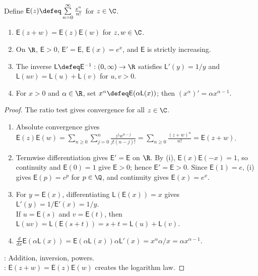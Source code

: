 \begin{theorem} \label{thm:exponential-logarithm-from-power-series} \\
Define $\mathsf{E}(z)\defeq\sum\limits_{n=0}^{\infty}\frac{z^n}{n!}$ for $z\in\C$.
\begin{enumerate}[label=(\roman*)]
\setlength{\itemsep}{0pt}
\item $\mathsf{E}(z+w)=\mathsf{E}(z)\mathsf{E}(w)$ for $z,w\in\C$.
\item On $\R$, $\mathsf{E}>0$, $\mathsf{E}'=\mathsf{E}$, $\mathsf{E}(x)=e^x$, and $\mathsf{E}$ is strictly increasing.
\item The inverse $\mathsf{L}\defeq\mathsf{E}^{-1}:(0,\infty)\to\R$ satisfies $\mathsf{L}'(y)=1/y$ and $\mathsf{L}(uv)=\mathsf{L}(u)+\mathsf{L}(v)$ for $u,v>0$.
\item For $x>0$ and $\alpha\in\R$, set $x^\alpha\defeq\mathsf{E}(\alpha\mathsf{L}(x))$; then $(x^\alpha)'=\alpha x^{\alpha-1}$.
\end{enumerate}
\begin{proof}
The ratio test gives convergence for all $z\in\C$.
\begin{enumerate}[label=(\roman*)]
\setlength{\itemsep}{0pt}
\item Absolute convergence gives $\mathsf{E}(z)\mathsf{E}(w)=\sum\limits_{n\geq0}\sum\limits_{j=0}^{n}\frac{z^jw^{n-j}}{j!(n-j)!}=\sum\limits_{n\geq0}\frac{(z+w)^n}{n!}=\mathsf{E}(z+w)$.
\item Termwise differentiation gives $\mathsf{E}'=\mathsf{E}$ on $\R$. By (i), $\mathsf{E}(x)\mathsf{E}(-x)=1$, so continuity and $\mathsf{E}(0)=1$ give $\mathsf{E}>0$; hence $\mathsf{E}'=\mathsf{E}>0$. Since $\mathsf{E}(1)=e$, (i) gives $\mathsf{E}(p)=e^p$ for $p\in\Q$, and continuity gives $\mathsf{E}(x)=e^x$.
\item For $y=\mathsf{E}(x)$, differentiating $\mathsf{L}(\mathsf{E}(x))=x$ gives $\mathsf{L}'(y)=1/\mathsf{E}'(x)=1/y$.\\
If $u=\mathsf{E}(s)$ and $v=\mathsf{E}(t)$, then $\mathsf{L}(uv)=\mathsf{L}(\mathsf{E}(s+t))=s+t=\mathsf{L}(u)+\mathsf{L}(v)$.
\item $\frac{d}{dx}\mathsf{E}(\alpha\mathsf{L}(x))=\mathsf{E}(\alpha\mathsf{L}(x))\alpha\mathsf{L}'(x)=x^\alpha\alpha/x=\alpha x^{\alpha-1}$.
\end{enumerate}
: Addition, inversion, powers.\\
: $\mathsf{E}(z+w)=\mathsf{E}(z)\mathsf{E}(w)$ creates the logarithm law.
\end{proof}
\end{theorem}

